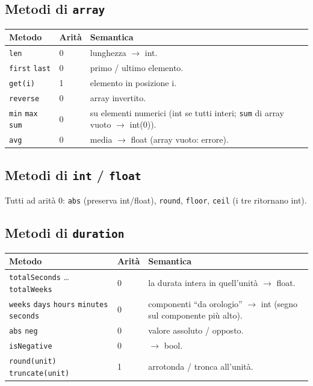 \documentclass[11pt,a4paper]{book}
\let\code\lstinline
\newcommand{\ic}[1]{{\ttfamily #1}}
\theoremstyle{definition}
\begin{document}
{{{{\subsection{Metodi di \texttt{array}}

\begin{center}
\small
\begin{tabular}{@{}l l p{7.6cm}@{}}
\toprule
\textbf{Metodo} & \textbf{Arità} & \textbf{Semantica} \\
\midrule
\code|len| & 0 & lunghezza $\rightarrow$ \ic{int}. \\
\code|first| \code|last| & 0 & primo / ultimo elemento. \\
\code|get(i)| & 1 & elemento in posizione \ic{i}. \\
\code|reverse| & 0 & array invertito. \\
\code|min| \code|max| \code|sum| & 0 & su elementi numerici (\ic{int} se tutti
interi; \code|sum| di array vuoto $\rightarrow$ \ic{int(0)}). \\
\code|avg| & 0 & media $\rightarrow$ \ic{float} (array vuoto: errore). \\
\bottomrule
\end{tabular}
\end{center}

\subsection{Metodi di \texttt{int} / \texttt{float}}

Tutti ad arità 0: \code|abs| (preserva int/float), \code|round|, \code|floor|,
\code|ceil| (i tre ritornano \ic{int}).

\subsection{Metodi di \texttt{duration}}

\begin{center}
\small
\begin{tabular}{@{}l l p{7.4cm}@{}}
\toprule
\textbf{Metodo} & \textbf{Arità} & \textbf{Semantica} \\
\midrule
\code|totalSeconds| \ldots \code|totalWeeks| & 0 & la durata intera in
quell'unità $\rightarrow$ \ic{float}. \\
\code|weeks| \code|days| \code|hours| \code|minutes| \code|seconds| & 0 &
componenti ``da orologio'' $\rightarrow$ \ic{int} (segno sul componente più alto). \\
\code|abs| \code|neg| & 0 & valore assoluto / opposto. \\
\code|isNegative| & 0 & $\rightarrow$ \ic{bool}. \\
\code|round(unit)| \code|truncate(unit)| & 1 & arrotonda / tronca all'unità. \\
\bottomrule
\end{tabular}
\end{center}

}}}}
\end{document}
